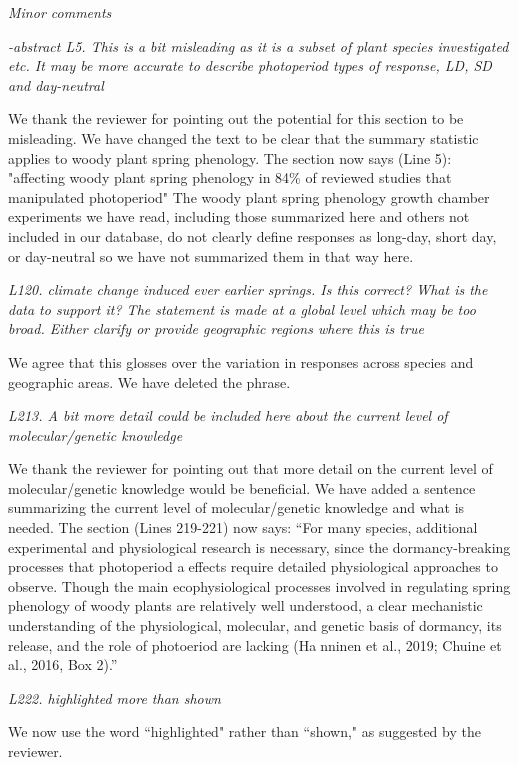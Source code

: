 \documentclass{article}
\begin{document}
\par \emph{Minor comments}
\par \emph{-abstract L5. This is a bit misleading as it is a subset of plant species investigated etc. It may be more accurate to describe photoperiod types of response, LD, SD and day-neutral}

\par We thank the reviewer for pointing out the potential for this section to be misleading. We have changed the text to be clear that the summary statistic applies to woody plant spring phenology. The section now says (Line 5): 
"affecting woody plant spring phenology in 84\% of reviewed studies that manipulated photoperiod"
The woody plant spring phenology growth chamber experiments we have read, including those summarized here and others not included in our database, do not clearly define responses as long-day, short day, or day-neutral so we have not summarized them in that way here. 
\par \emph{L120. climate change induced ever earlier springs. Is this correct? What is the data to support it? The statement is made at a global level which may be too broad. Either clarify or provide geographic regions where this is true}
\par We agree that this glosses over the variation in responses across species and geographic areas. We have deleted the phrase. 

\par \emph{L213. A bit more detail could be included here about the current level of molecular/genetic knowledge}
\par We thank the reviewer for pointing out that more detail on the current level of molecular/genetic knowledge would be beneficial. We have added a sentence summarizing the current level of molecular/genetic knowledge and what is needed. The section (Lines 219-221) now says:
``For many species, additional experimental and physiological research is necessary, since the dormancy-breaking processes that photoperiod aeffects require detailed physiological approaches to observe. Though the main ecophysiological processes involved in regulating spring phenology of woody plants are relatively well understood, a clear mechanistic understanding of the physiological, molecular, and genetic basis of dormancy, its release, and the role of photoeriod are lacking  (Hanninen et al., 2019; Chuine et al., 2016, Box 2).''

\par \emph{L222. highlighted more than shown}
\par We now use the word ``highlighted" rather than ``shown," as suggested by the reviewer.
\end{document}
